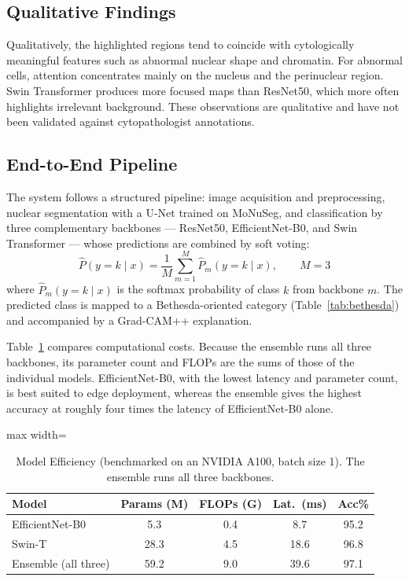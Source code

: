 \documentclass[conference]{IEEEtran}
\begin{document}
\subsection{Qualitative Findings}

Qualitatively, the highlighted regions tend to coincide with cytologically meaningful features such as abnormal nuclear shape and chromatin. For abnormal cells, attention concentrates mainly on the nucleus and the perinuclear region. Swin Transformer produces more focused maps than ResNet50, which more often highlights irrelevant background. These observations are qualitative and have not been validated against cytopathologist annotations.

\subsection{End-to-End Pipeline}

The system follows a structured pipeline: image acquisition and preprocessing, nuclear segmentation with a U-Net trained on MoNuSeg, and classification by three complementary backbones --- ResNet50, EfficientNet-B0, and Swin Transformer --- whose predictions are combined by soft voting:
\begin{equation}
    \hat{P}(y=k \mid x)=\frac{1}{M}\sum_{m=1}^{M}\hat{P}_m(y=k \mid x), \qquad M=3
    \label{eq:ensemble}
\end{equation}
where $\hat{P}_m(y=k \mid x)$ is the softmax probability of class $k$ from backbone $m$. The predicted class is mapped to a Bethesda-oriented category (Table~\ref{tab:bethesda}) and accompanied by a Grad-CAM++ explanation.

Table~\ref{tab:efficiency} compares computational costs. Because the ensemble runs all three backbones, its parameter count and FLOPs are the sums of those of the individual models. EfficientNet-B0, with the lowest latency and parameter count, is best suited to edge deployment, whereas the ensemble gives the highest accuracy at roughly four times the latency of EfficientNet-B0 alone.

\begin{table}[t]
\caption{Model Efficiency (benchmarked on an NVIDIA A100, batch size 1). The ensemble runs all three backbones.}
\label{tab:efficiency}
\centering
\begin{adjustbox}{max width=\columnwidth}
\begin{tabular}{lcccc}
\toprule
\textbf{Model} & \textbf{Params (M)} & \textbf{FLOPs (G)} & \textbf{Lat.\ (ms)} & \textbf{Acc\%}\\
\midrule

EfficientNet-B0 & 5.3  & 0.4 & 8.7  & 95.2\\
Swin-T          & 28.3 & 4.5 & 18.6 & 96.8\\
Ensemble (all three) & 59.2 & 9.0 & 39.6 & 97.1\\
\bottomrule
\end{tabular}
\end{adjustbox}
\end{table}
\end{document}
